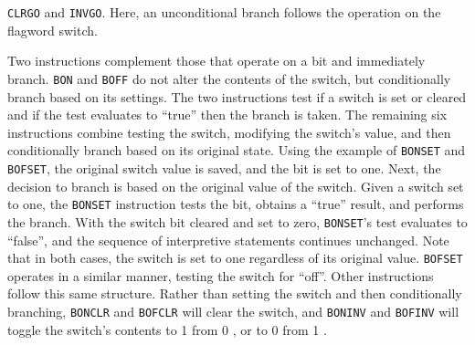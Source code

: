 \documentclass[refcap, oxford]{ahsan}
\begin{document}
\texttt{CLRGO} and \texttt{INVGO}. Here, an unconditional branch follows the operation on the flagword switch.

Two instructions complement those that operate on a bit and immediately branch. \texttt{BON} and \texttt{BOFF} do not alter the contents of the switch, but conditionally branch based on its settings. The two instructions test if a switch is set or cleared and if the test evaluates to ``true'' then the branch is taken. The remaining six instructions combine testing the switch, modifying the switch's value, and then conditionally branch based on its original state. Using the example of \texttt{BONSET} and \texttt{BOFSET}, the original switch value is saved, and the bit is set to one. Next, the decision to branch is based on the original value of the switch. Given a switch set to one, the \texttt{BONSET} instruction tests the bit, obtains a ``true'' result, and performs the branch. With the switch bit cleared and set to zero, \texttt{BONSET}'s test evaluates to ``false'', and the sequence of interpretive statements continues unchanged. Note that in both cases, the switch is set to one regardless of its original value. \texttt{BOFSET} operates in a similar manner, testing the switch for ``off''. Other instructions follow this same structure. Rather than setting the switch and then conditionally branching, \texttt{BONCLR} and \texttt{BOFCLR} will clear the switch, and \texttt{BONINV} and \texttt{BOFINV} will toggle the switch's contents to 1 from 0 , or to 0 from 1 .
\end{document}
